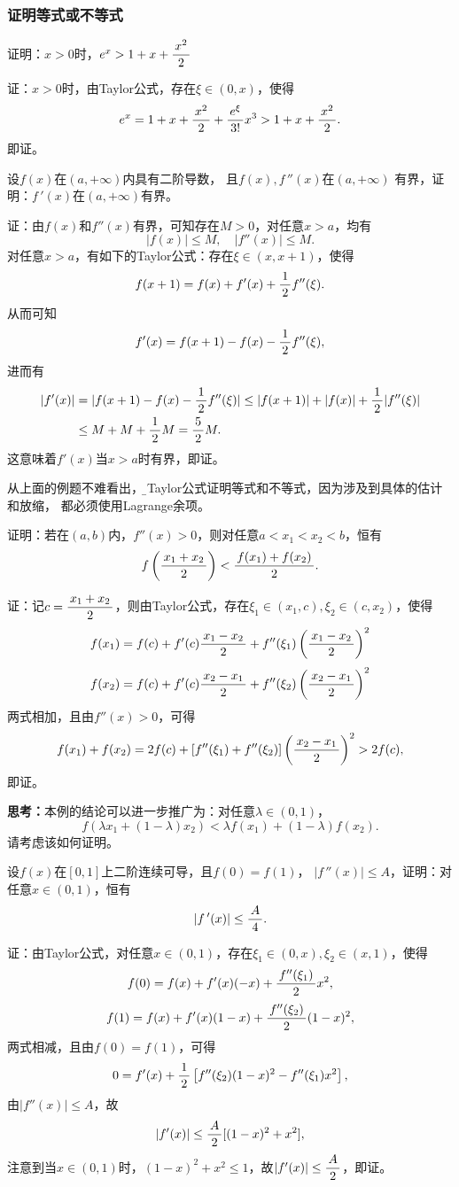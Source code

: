 \subsubsection{证明等式或不等式}

\egz 证明：$x>0$时，$e^x>1+x+\displaystyle\frac{\,{x^2}\,}{\,{2}\,}$

证：$x>0$时，由Taylor公式，存在$\xi\in(0,x)$，使得
$$e^x=1+x+\displaystyle\frac{\,{x^2}\,}{\,{2}\,}+\displaystyle\frac{\,{e^{\xi}}\,}{\,{3!}\,}x^3>1+x+\displaystyle\frac{\,{x^2}\,}{\,{2}\,}.$$
即证。\fin

\egz 设$f(x)$在$(a,+\infty)$内具有二阶导数，
且$f(x),f\,''(x)$在$(a,+\infty)$
有界，证明：$f\,'(x)$在$(a,+\infty)$有界。

证：由$f(x)$和$f''(x)$有界，可知存在$M>0$，对任意$x>a$，均有
$$|f(x)|\leq M,\quad |f''(x)|\leq M.$$
对任意$x>a$，有如下的Taylor公式：存在$\xi\in(x,x+1)$，使得
$$f(x+1)=f(x)+f'(x)+\displaystyle\frac{\,{1}\,}{\,{2}\,}f''(\xi).$$
从而可知
$$f'(x)=f(x+1)-f(x)-\displaystyle\frac{\,{1}\,}{\,{2}\,}f''(\xi),$$
进而有
\begin{align*}
	|f'(x)|&=|f(x+1)-f(x)-\displaystyle\frac{\,{1}\,}{\,{2}\,}f''(\xi)|
	\leq |f(x+1)|+|f(x)|+\displaystyle\frac{\,{1}\,}{\,{2}\,}|f''(\xi)|\\
	&\leq M+M+\displaystyle\frac{\,{1}\,}{\,{2}\,}M=\displaystyle\frac{\,{5}\,}{\,{2}\,}M.
\end{align*}
这意味着$f'(x)$当$x>a$时有界，即证。\fin

从上面的例题不难看出，{\b 用Taylor公式证明等式和不等式，因为涉及到具体的估计和放缩，
都必须使用Lagrange余项}。

\egz 证明：若在$(a,b)$内，$f''(x)>0$，则对任意$a<x_1<x_2<b$，恒有
$$f\left(\displaystyle\frac{\,{x_1+x_2}\,}{\,{2}\,}\right)<\displaystyle\frac{\,{f(x_1)+f(x_2)}\,}{\,{2}\,}.$$

证：记$c=\displaystyle\frac{\,{x_1+x_2}\,}{\,{2}\,}$，则由Taylor公式，存在$\xi_1\in(x_1,c),
\xi_2\in(c,x_2)$，使得
$$f(x_1)=f(c)+f'(c)\displaystyle\frac{\,{x_1-x_2}\,}{\,{2}\,}+f''(\xi_1)
\left(\displaystyle\frac{\,{x_1-x_2}\,}{\,{2}\,}\right)^2$$
$$f(x_2)=f(c)+f'(c)\displaystyle\frac{\,{x_2-x_1}\,}{\,{2}\,}+f''(\xi_2)
\left(\displaystyle\frac{\,{x_2-x_1}\,}{\,{2}\,}\right)^2$$
两式相加，且由$f''(x)>0$，可得
$$f(x_1)+f(x_2)=2f(c)+[f''(\xi_1)+f''(\xi_2)]
\left(\displaystyle\frac{\,{x_2-x_1}\,}{\,{2}\,}\right)^2>2f(c),$$
即证。\fin

{\bf 思考：}本例的结论可以进一步推广为：对任意$\lambda\in(0,1)$，
$$f(\lambda x_1+(1-\lambda)x_2)<\lambda
f(x_1)+(1-\lambda)f(x_2).$$
请考虑该如何证明。

% 

\egz 设$f(x)$在$[0,1]$上二阶连续可导，且$f(0)=f(1)$，
$|f\,''(x)|\leq A$，证明：对任意$x\in(0,1)$，恒有
$$|f\,'(x)|\leq\displaystyle\frac{\,{A}\,}{\,{4}\,}.$$

证：由Taylor公式，对任意$x\in(0,1)$，存在$\xi_1\in(0,x),
\xi_2\in(x,1)$，使得
$$f(0)=f(x)+f'(x)(-x)+\displaystyle\frac{\,{f''(\xi_1)}\,}{\,{2}\,}x^2,$$
$$f(1)=f(x)+f'(x)(1-x)+\displaystyle\frac{\,{f''(\xi_2)}\,}{\,{2}\,}(1-x)^2,$$
两式相减，且由$f(0)=f(1)$，可得
$$0=f'(x)+\displaystyle\frac{\,{1}\,}{\,{2}\,}\left[f''(\xi_2)(1-x)^2-f''(\xi_1)x^2\right],$$
由$|f''(x)|\leq A$，故
$$|f'(x)|\leq\displaystyle\frac{\,{A}\,}{\,{2}\,}[(1-x)^2+x^2],$$
注意到当$x\in(0,1)$时，$(1-x)^2+x^2\leq1$，故$|f'(x)|\leq\displaystyle\frac{\,{A}\,}{\,{2}\,}$，即证。
\fin

